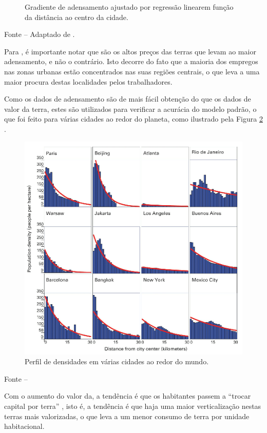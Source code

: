 \documentclass[
	12pt,				%
	oneside,			%
	a4paper,			%
	chapter=TITLE,		%
	section=TITLE,		%
	english,			%
	brazil				%
	]{abntex2}
\newcommand{\bcenter}{\begin{center}}
\newcommand{\ecenter}{\end{center}}
\begin{document}
\begin{refsection}
\begin{figure}[H]
{}

\caption{Gradiente de adensamento ajustado por regressão linearem função da distância ao centro da cidade.}\label{fig:monocentricModel2}
\end{figure}
\bcenter

\small Fonte -- Adaptado de \textcite[p.~97]{bertaud}.
\ecenter

Para \textcite[p.~96]{bertaud}, é importante notar que são os altos preços
das terras que levam ao maior adensamento, e não o
contrário. Isto decorre do fato que a maioria dos empregos nas zonas urbanas
estão concentrados nas suas regiões centrais, o que leva a uma maior procura
destas localidades pelos trabalhadores.

Como os dados de adensamento são de mais fácil obtenção do que os dados de valor
da terra, estes são utilizados para verificar a acurácia do modelo padrão, o que
foi feito para várias cidades ao redor do planeta, como ilustrado pela Figura
\ref{fig:densities} .
\begin{figure}[H]

{\centering \includegraphics[width=0.7\linewidth]{images/densities} 

}

\caption{Perfil de densidades em várias cidades ao redor do mundo.}\label{fig:densities}
\end{figure}
\bcenter

Fonte -- \textcite[p.~102]{bertaud}
\ecenter

Com o aumento do valor da, a tendência é que os habitantes
passem a ``trocar capital por terra'' \autocite[p.~234-237]{bertaud}, isto
é, a tendência é que haja uma maior verticalização nestas terras mais
valorizadas, o que leva a um menor consumo de terra por unidade habitacional.


\end{refsection}
\end{document}
